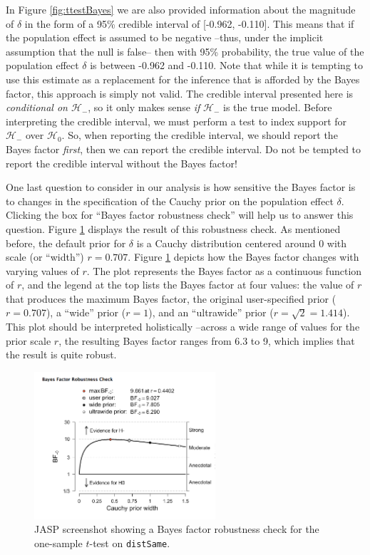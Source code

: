 \documentclass[english,,doc,floatsintext]{apa6}
\begin{document}
In Figure \ref{fig:ttestBayes} we are also provided information about the magnitude of \(\delta\) in the form of a 95\% credible interval of {[}-0.962, -0.110{]}. This means that if the population effect is assumed to be negative --thus, under the implicit assumption that the null is false-- then with 95\% probability, the true value of the population effect \(\delta\) is between -0.962 and -0.110. Note that while it is tempting to use this estimate as a replacement for the inference that is afforded by the Bayes factor, this approach is simply not valid. The credible interval presented here is \emph{conditional on \(\mathcal{H}_{-}\)}, so it only makes sense \emph{if} \(\mathcal{H}_{-}\) is the true model. Before interpreting the credible interval, we must perform a test to index support for \(\mathcal{H}_{-}\) over \(\mathcal{H}_{0}\). So, when reporting the credible interval, we should report the Bayes factor \emph{first}, then we can report the credible interval. Do not be tempted to report the credible interval without the Bayes factor!

One last question to consider in our analysis is how sensitive the Bayes factor is to changes in the specification of the Cauchy prior on the population effect \(\delta\). Clicking the box for ``Bayes factor robustness check'' will help us to answer this question. Figure \ref{fig:ttestRobust} displays the result of this robustness check. As mentioned before, the default prior for \(\delta\) is a Cauchy distribution centered around \(0\) with scale (or ``width'') \(r=0.707\). Figure \ref{fig:ttestRobust} depicts how the Bayes factor changes with varying values of \(r\). The plot represents the Bayes factor as a continuous function of \(r\), and the legend at the top lists the Bayes factor at four values: the value of \(r\) that produces the maximum Bayes factor, the original user-specified prior (\(r=0.707\)), a ``wide'' prior (\(r=1\)), and an ``ultrawide'' prior (\(r=\sqrt{2}=1.414\)). This plot should be interpreted holistically --across a wide range of values for the prior scale \(r\), the resulting Bayes factor ranges from 6.3 to 9, which implies that the result is quite robust.

\begin{figure}
\centering
\includegraphics[width=0.6\textwidth,height=\textheight]{figures/ttestRobust.png}
\caption{\label{fig:ttestRobust}JASP screenshot showing a Bayes factor robustness check for the one-sample \(t\)-test on \texttt{distSame}.}
\end{figure}
\end{document}
